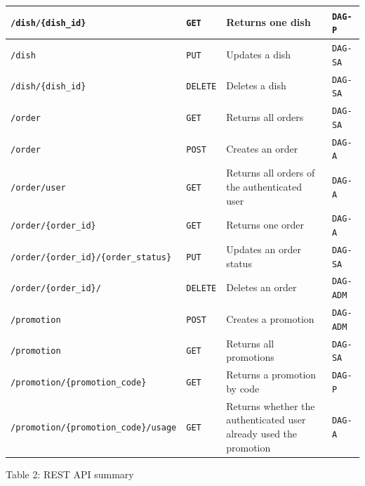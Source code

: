 \begin{longtable}{|>{\raggedright\arraybackslash}p{}|>{\raggedright\arraybackslash}p{}|>{\raggedright\arraybackslash}p{}|>{\raggedright\arraybackslash}p{}|}
\hline
\texttt{/dish/\{dish\_id\}} & \texttt{GET} & Returns one dish & \texttt{DAG-P} \\
\hline
\texttt{/dish} & \texttt{PUT} & Updates a dish & \texttt{DAG-SA} \\
\hline
\texttt{/dish/\{dish\_id\}} & \texttt{DELETE} & Deletes a dish & \texttt{DAG-SA} \\
\hline
\texttt{/order} & \texttt{GET} & Returns all orders & \texttt{DAG-SA} \\
\hline
\texttt{/order} & \texttt{POST} & Creates an order & \texttt{DAG-A} \\
\hline
\texttt{/order/user} & \texttt{GET} & Returns all orders of the authenticated user & \texttt{DAG-A} \\
\hline
\texttt{/order/\{order\_id\}} & \texttt{GET} & Returns one order & \texttt{DAG-A} \\
\hline
\texttt{/order/\{order\_id\}/\{order\_status\}} & \texttt{PUT} & Updates an order status & \texttt{DAG-SA} \\
\hline
\texttt{/order/\{order\_id\}/} & \texttt{DELETE} & Deletes an order & \texttt{DAG-ADM} \\
\hline
\texttt{/promotion} & \texttt{POST} & Creates a promotion & \texttt{DAG-ADM} \\
\hline
\texttt{/promotion} & \texttt{GET} & Returns all promotions & \texttt{DAG-SA} \\
\hline
\texttt{/promotion/\{promotion\_code\}} & \texttt{GET} & Returns a promotion by code & \texttt{DAG-P} \\
\hline
\texttt{/promotion/\{promotion\_code\}/usage} & \texttt{GET} & Returns whether the authenticated user already used the promotion & \texttt{DAG-A} \\
\hline
\end{longtable}
\normalsize


\begin{center}
Table 2: REST API summary
\end{center}
